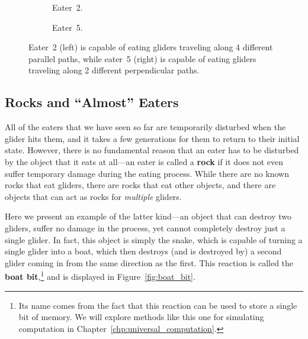 \begin{figure}[!htb]
	\begin{subfigure}{.5\textwidth}
		\centering
		\caption{Eater~2.}
		\label{fig:eater_2}
	\end{subfigure}%
	\begin{subfigure}{.5\textwidth}
		\centering
		\caption{Eater~5.}
		\label{fig:eater_5}
	\end{subfigure}
	\caption{Eater~2 (left) is capable of eating gliders traveling along 4 different parallel paths, while eater~5 (right) is capable of eating gliders traveling along 2 different perpendicular paths.}\label{fig:eater_2_5}
\end{figure}


\subsection{Rocks and ``Almost'' Eaters}\label{sec:rocks_almost_eaters}

All of the eaters that we have seen so far are temporarily disturbed when the glider hits them, and it takes a few generations for them to return to their initial state. However, there is no fundamental reason that an eater has to be disturbed by the object that it eats at all---an eater is called a \textbf{rock} if it does not even suffer temporary damage during the eating process. While there are no known rocks that eat gliders, there are rocks that eat other objects, and there are objects that can act as rocks for \emph{multiple} gliders.

Here we present an example of the latter kind---an object that can destroy two gliders, suffer no damage in the process, yet cannot completely destroy just a single glider. In fact, this object is simply the snake, which is capable of turning a single glider into a boat, which then destroys (and is destroyed by) a second glider coming in from the same direction as the first. This reaction is called the \textbf{boat bit},\footnote{Its name comes from the fact that this reaction can be used to store a single bit of memory. We will explore methods like this one for simulating computation in Chapter~\ref{chp:universal_computation}.} and is displayed in Figure~\ref{fig:boat_bit}.


